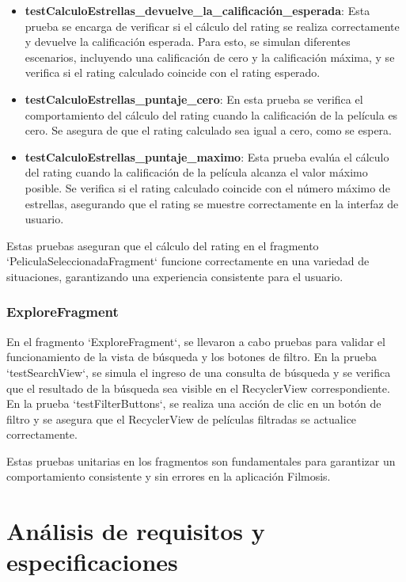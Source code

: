 \documentclass{article}
\begin{document}
\begin{itemize}
    \item \textbf{testCalculoEstrellas\_devuelve\_la\_calificación\_esperada}: Esta prueba se encarga de verificar si el cálculo del rating se realiza correctamente y devuelve la calificación esperada. Para esto, se simulan diferentes escenarios, incluyendo una calificación de cero y la calificación máxima, y se verifica si el rating calculado coincide con el rating esperado.
    
    \item \textbf{testCalculoEstrellas\_puntaje\_cero}: En esta prueba se verifica el comportamiento del cálculo del rating cuando la calificación de la película es cero. Se asegura de que el rating calculado sea igual a cero, como se espera.
    
    \item \textbf{testCalculoEstrellas\_puntaje\_maximo}: Esta prueba evalúa el cálculo del rating cuando la calificación de la película alcanza el valor máximo posible. Se verifica si el rating calculado coincide con el número máximo de estrellas, asegurando que el rating se muestre correctamente en la interfaz de usuario.
\end{itemize}

Estas pruebas aseguran que el cálculo del rating en el fragmento `PeliculaSeleccionadaFragment` funcione correctamente en una variedad de situaciones, garantizando una experiencia consistente para el usuario.

\subsubsection{ExploreFragment}

En el fragmento `ExploreFragment`, se llevaron a cabo pruebas para validar el funcionamiento de la vista de búsqueda y los botones de filtro. En la prueba `testSearchView`, se simula el ingreso de una consulta de búsqueda y se verifica que el resultado de la búsqueda sea visible en el RecyclerView correspondiente. En la prueba `testFilterButtons`, se realiza una acción de clic en un botón de filtro y se asegura que el RecyclerView de películas filtradas se actualice correctamente.

Estas pruebas unitarias en los fragmentos son fundamentales para garantizar un comportamiento consistente y sin errores en la aplicación Filmosis.






\section{Análisis de requisitos y especificaciones}
\end{document}
